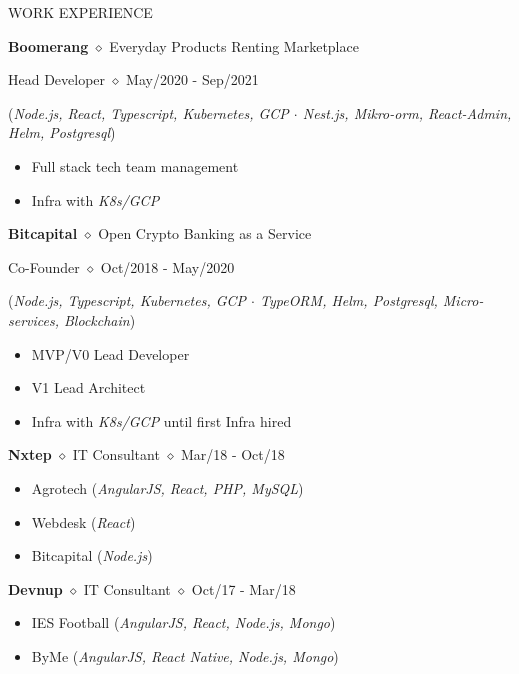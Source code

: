 \documentclass{cv} %
\begin{document}
\begin{rSection}{WORK EXPERIENCE}
\vspace{-1.25em}

\item \textbf{Boomerang} {$\diamond$} Everyday Products Renting Marketplace
\item \hspace{0.25in} {Head Developer} {$\diamond$}  {May/2020 - Sep/2021}
\item \hspace{0.25in} (\textit{{Node.js, React, Typescript, Kubernetes, GCP} {$\cdot$} {Nest.js, Mikro-orm, React-Admin, Helm, Postgresql}})
\begin{itemize}
    \itemsep -3pt {} 
    \item Full stack tech team management
    \item Infra with \textit{K8s/GCP}
\end{itemize}

\medskip

\item \textbf{Bitcapital} {$\diamond$} {Open Crypto Banking as a Service}
\item \hspace{0.25in} {Co-Founder} {$\diamond$} {Oct/2018 - May/2020}
\item \hspace{0.25in} (\textit{{Node.js, Typescript, Kubernetes, GCP} {$\cdot$} {TypeORM, Helm, Postgresql, Micro-services, Blockchain}})
\begin{itemize}
    \itemsep -3pt {} 
    \item MVP/V0 Lead Developer
    \item V1 Lead Architect
    \item Infra with \textit{K8s/GCP} until first Infra hired
\end{itemize}

\medskip

\item \textbf{Nxtep} {$\diamond$} {IT Consultant} {$\diamond$} {Mar/18 - Oct/18}
\begin{itemize}
    \itemsep -3pt {} 
    \item Agrotech (\textit{AngularJS, React, PHP, MySQL})
    \item Webdesk (\textit{React})
    \item Bitcapital (\textit{Node.js})
\end{itemize}

\medskip

\item \textbf{Devnup} {$\diamond$} {IT Consultant} {$\diamond$} {Oct/17 - Mar/18}
\begin{itemize}
    \itemsep -3pt {} 
    \item IES Football (\textit{AngularJS, React, Node.js, Mongo})
    \item ByMe (\textit{AngularJS, React Native, Node.js, Mongo})
\end{itemize}

\medskip

\end{rSection} 
\end{document}
